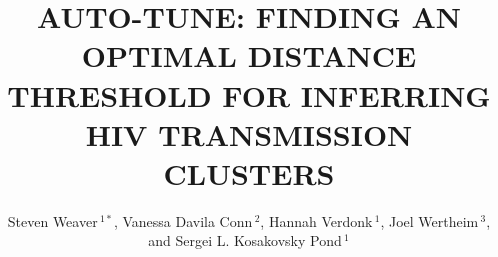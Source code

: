 \documentclass[utf8]{FrontiersinHarvard} %
\def\firstAuthorLast{Weaver {et~al.}} %
\def\Authors{Steven Weaver\,$^{1*}$, Vanessa Davila Conn\,$^{2}$, Hannah Verdonk\,$^{1}$, Joel Wertheim\,$^{3}$, and Sergei L. Kosakovsky Pond\,$^{1}$}
\begin{document}
\onecolumn
{}

\title { AUTO-TUNE: FINDING AN OPTIMAL DISTANCE THRESHOLD FOR INFERRING HIV TRANSMISSION CLUSTERS } 

\author[\firstAuthorLast ]{\Authors} %
\address{} %
\correspondance{} %

\extraAuth{}%


\maketitle
\end{document}
